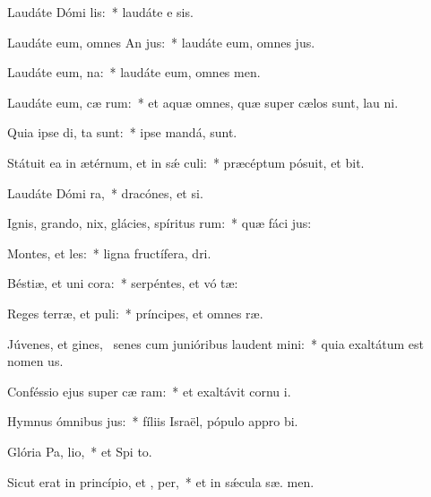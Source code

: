 \item Laudáte Dómi  lis:~* laudáte e  sis.
\item Laudáte eum, omnes An jus:~* laudáte eum, omnes  jus.
\item Laudáte eum,   na:~* laudáte eum, omnes   men.
\item Laudáte eum, cæ rum:~* et aquæ omnes, quæ super cælos sunt, lau  ni.
\item Quia ipse di,  ta sunt:~* ipse mandá,   sunt.
\item Státuit ea in ætérnum, et in sǽ culi:~* præcéptum pósuit, et  bit.
\item Laudáte Dómi  ra,~* dracónes, et  si.
\item Ignis, grando, nix, glácies, spíritus rum:~* quæ fáci  jus:
\item Montes, et  les:~* ligna fructífera,   dri.
\item Béstiæ, et uni cora:~* serpéntes, et vó tæ:
\item Reges terræ, et  puli:~* príncipes, et omnes  ræ.
\item Júvenes, et gines,~\pscross{} senes cum junióribus laudent  mini:~* quia exaltátum est nomen  us.
\item Conféssio ejus super cæ  ram:~* et exaltávit cornu  i.
\item Hymnus ómnibus  jus:~* fíliis Israël, pópulo appro bi.
\item Glória Pa,  lio,~* et Spi to.
\item Sicut erat in princípio, et ,  per,~* et in sǽcula sæ. men.
